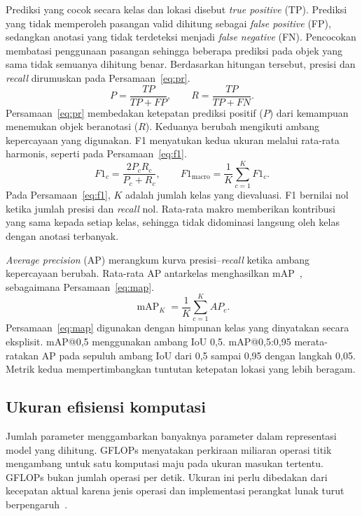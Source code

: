 Prediksi yang cocok secara kelas dan lokasi disebut \textit{true positive} (TP). Prediksi yang tidak memperoleh pasangan valid dihitung sebagai \textit{false positive} (FP), sedangkan anotasi yang tidak terdeteksi menjadi \textit{false negative} (FN). Pencocokan membatasi penggunaan pasangan sehingga beberapa prediksi pada objek yang sama tidak semuanya dihitung benar. Berdasarkan hitungan tersebut, presisi dan \textit{recall} dirumuskan pada Persamaan~\eqref{eq:pr}.
\begin{equation}
P=\frac{TP}{TP+FP},\qquad R=\frac{TP}{TP+FN}.
\label{eq:pr}
\end{equation}
Persamaan~\eqref{eq:pr} membedakan ketepatan prediksi positif ($P$) dari kemampuan menemukan objek beranotasi ($R$). Keduanya berubah mengikuti ambang kepercayaan yang digunakan. F1 menyatukan kedua ukuran melalui rata-rata harmonis, seperti pada Persamaan~\eqref{eq:f1}.
\begin{equation}
F1_c=\frac{2P_cR_c}{P_c+R_c},\qquad
F1_{\mathrm{macro}}=\frac{1}{K}\sum_{c=1}^{K}F1_c.
\label{eq:f1}
\end{equation}
Pada Persamaan~\eqref{eq:f1}, $K$ adalah jumlah kelas yang dievaluasi. F1 bernilai nol ketika jumlah presisi dan \textit{recall} nol. Rata-rata makro memberikan kontribusi yang sama kepada setiap kelas, sehingga tidak didominasi langsung oleh kelas dengan anotasi terbanyak.

\textit{Average precision} (AP) merangkum kurva presisi--\textit{recall} ketika ambang kepercayaan berubah. Rata-rata AP antarkelas menghasilkan mAP~\cite{Li2024,Wu2023}, sebagaimana Persamaan~\eqref{eq:map}.
\begin{equation}
\operatorname{mAP}_{K}=\frac{1}{K}\sum_{c=1}^{K}AP_c.
\label{eq:map}
\end{equation}
Persamaan~\eqref{eq:map} digunakan dengan himpunan kelas yang dinyatakan secara eksplisit. mAP@0,5 menggunakan ambang IoU 0,5. mAP@0,5:0,95 merata-ratakan AP pada sepuluh ambang IoU dari 0,5 sampai 0,95 dengan langkah 0,05. Metrik kedua mempertimbangkan tuntutan ketepatan lokasi yang lebih beragam.

\subsection{Ukuran efisiensi komputasi}
Jumlah parameter menggambarkan banyaknya parameter dalam representasi model yang dihitung. GFLOPs menyatakan perkiraan miliaran operasi titik mengambang untuk satu komputasi maju pada ukuran masukan tertentu. GFLOPs bukan jumlah operasi per detik. Ukuran ini perlu dibedakan dari kecepatan aktual karena jenis operasi dan implementasi perangkat lunak turut berpengaruh~\cite{Wu2023}.

